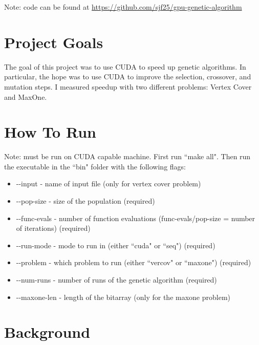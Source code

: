 \documentclass[9pt]{article}
\begin{document}
\maketitle

Note: code can be found at \url{https://github.com/sjf25/gpu-genetic-algorithm}

\section{Project Goals}
The goal of this project was to use CUDA to speed up genetic algorithms. In particular, the hope was to use CUDA to improve the selection, crossover, and mutation steps. I measured speedup with two different problems: Vertex Cover and MaxOne.

\section{How To Run}
Note: must be run on CUDA capable machine. First run ``make all". Then run the executable in the ``bin" folder with the following flags:
	\begin{itemize}
		\item -{}-input - name of input file (only for vertex cover problem)
		\item -{}-pop-size - size of the population (required)
		\item -{}-func-evals - number of function evaluations (func-evals/pop-size = number of iterations) (required)
		\item -{}-run-mode - mode to run in (either ``cuda" or ``seq") (required)
		\item -{}-problem - which problem to run (either ``vercov" or ``maxone") (required)
		\item -{}-num-runs - number of runs of the genetic algorithm (required)
		\item -{}-maxone-len - length of the bitarray (only for the maxone problem)
	\end{itemize}

\section{Background}
\end{document}
